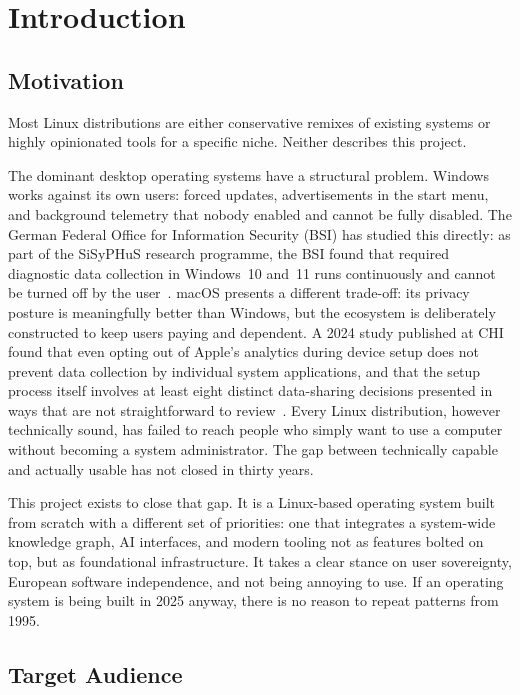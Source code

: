 \section{Introduction}
\label{sec:introduction}

\subsection{Motivation}
\label{sec:motivation}

Most Linux distributions are either conservative remixes of existing systems or
highly opinionated tools for a specific niche. Neither describes this project.

The dominant desktop operating systems have a structural problem. Windows works
against its own users: forced updates, advertisements in the start menu, and
background telemetry that nobody enabled and cannot be fully disabled. The German
Federal Office for Information Security (BSI) has studied this directly: as part
of the SiSyPHuS research programme, the BSI found that required diagnostic data
collection in Windows~10 and~11 runs continuously and cannot be turned off by
the user~\cite{bsi2022sisyphus}. macOS presents a different trade-off: its
privacy posture is meaningfully better than Windows, but the ecosystem is
deliberately constructed to keep users paying and dependent. A 2024 study
published at CHI found that even opting out of Apple's analytics during device
setup does not prevent data collection by individual system applications, and
that the setup process itself involves at least eight distinct data-sharing
decisions presented in ways that are not straightforward to review~\cite{kollnig2024apple}.
Every Linux distribution, however technically sound, has failed to reach people
who simply want to use a computer without becoming a system administrator. The
gap between technically capable and actually usable has not closed in thirty years.

This project exists to close that gap. It is a Linux-based operating system
built from scratch with a different set of priorities: one that integrates a
system-wide knowledge graph, AI interfaces, and modern tooling not as features
bolted on top, but as foundational infrastructure. It takes a clear stance on
user sovereignty, European software independence, and not being annoying to use.
If an operating system is being built in 2025 anyway, there is no reason to
repeat patterns from 1995.

\subsection{Target Audience}
\label{sec:audience}

